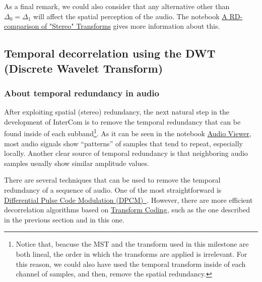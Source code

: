 As a final remark, we could also consider that any alternative other than $\Delta_0=\Delta_1$ will affect the spatial perception of the audio. The notebook \href{https://github.com/Tecnologias-multimedia/Tecnologias-multimedia.github.io/blob/master/contents/transform_coding/stereo_transforms_RD.ipynb}{A
  RD-comparison of "Stereo" Transforms} gives more information about this.



\subsection{Temporal decorrelation using the DWT (Discrete Wavelet Transform)}

\subsubsection{About temporal redundancy in audio}

After exploiting spatial (stereo) redundancy, the next natural
step in the development of InterCom is to remove the temporal
redundancy that can be found inside of each subband\footnote{Notice
that, beacuse the MST and the transform used in this milestone are
both lineal, the order in which the transforms are applied is
irrelevant. For this reason, we could also have used the temporal
transform inside of each channel of samples, and then, remove the
spatial redundancy.}. As it can be seen in the notebook
\href{https://github.com/Tecnologias-multimedia/intercom/blob/master/tools/audio_viewer.ipynb}{Audio Viewer},
most audio signals show ``patterns'' of samples that tend to repeat,
especially locally. Another clear source of temporal redundancy is
that neighboring audio samples usually show similar amplitude values.

There are several techniques that can be used to remove the
temporal redundancy of a sequence of audio. One of the most
straightforward is
\href{https://en.wikipedia.org/wiki/Differential_pulse-code_modulation}{Differential
  Pulse Code Modulation
  (DPCM)~\cite{sayood2017introduction}}. However, there are more
efficient decorrelation algorithms based on
\href{https://en.wikipedia.org/wiki/Transform_coding}{Transform
  Coding}, such as the one described in the previous section and in this
one.

